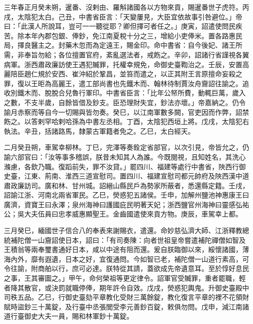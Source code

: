 
\begin{pinyinscope}

 三年春正月癸未朔，暹番、沒剌由、羅斛諸國各以方物來貢，賜暹番世子虎符。丙戌，太陰犯太白。己丑，中書省臣言：「天變屢見，大臣宜依故事引咎避位。」帝曰：「此漢人所說耳，豈可一一聽從耶？卿但擇可者任之。」庚寅，詔遣使問民疾苦。除本年內郡包銀、俸鈔，免江南夏稅十分之三，增給小吏俸米。置各路惠民局，擇良醫主之。封藥木忽而為定遠王，賜金印。命中書省：自今後妃、諸王所需，非奉旨勿給；各位擅置官府，紊亂選法者，戒飭之。辛卯，詔諸行省謹視各翼病軍。浙西肅政廉訪使王遇犯贓罪，托權幸規免，命御史臺鞫治之。壬辰，安置高麗陪臣趙仁規於安西、崔沖紹於鞏昌，並笞而遣之，以正其附王言原擅命妄殺之罪，復以王昛為高麗王，遣工部尚書也先鐵木而、翰林待制賈汝舟齎詔往諭之。追收別鐵木而、脫脫合兒魯行軍印。中書省臣言：「比年公帑所費，動輒巨萬，歲入之數，不支半歲，自餘皆借及鈔支。臣恐理財失宜，鈔法亦壞。」帝嘉納之。仍令諭月赤察而等自今一切賜與皆勿奏。癸巳，以江南軍數多闕，官吏因而作弊，詔禁飭之。以答剌罕哈剌哈孫為中書左丞相。丁酉，太陰犯西垣上將。戊戌，太陰犯右執法。辛丑，括諸路馬，隸蒙古軍籍者免之。乙巳，太白經天。



 二月癸丑朔，車駕幸柳林。丁巳，完澤等奏銓定省部官，以次引見，帝皆允之，仍諭六部官曰：「汝等事多稽誤，朕昔未知其人為誰。今既閱視，且知姓名，其洗心滌慮，各欽乃職。復蹈前失，罪不汝貸。」罷四川、福建等處行中書省，陜西行御史臺，江東、荊南、淮西三道宣慰司。置四川、福建宣慰司都元帥府及陜西漢中道肅政廉訪司。廣和林、甘州城。詔縉山縣民戶為勢家所蔽者，悉還縣定籍。壬戌，詔諭江浙、河南北兩省軍民。乙巳，熒惑犯五諸侯。壬申，加解州鹽池神惠康王曰廣濟，資寶王曰永澤；泉州海神曰護國庇民明著天妃；浙西鹽官州海神曰靈感弘祐公；吳大夫伍員曰忠孝威惠顯聖王。金齒國遣使來貢方物。庚辰，車駕幸上都。



 三月癸巳，緬國世子信合八的奉表來謝賜衣，遣還。命妙慈弘濟大師、江浙釋教總統補陀僧一山齎詔使日本，詔曰：「有司奏陳：向者世祖皇帝嘗遣補陀禪僧如智及王積翁等兩奉璽書通好日本，咸以中途有阻而還。爰自朕臨御以來，綏懷諸國，薄海內外，靡有遐遺，日本之好，宜復通問。今如智已老，補陀僧一山道行素高，可令往諭，附商舶以行，庶可必達。朕特從其請，蓋欲成先帝遺意耳。至於惇好息民之事，王其審圖之。」甲午，命何榮祖等更定律令。詔軍官受贓罪，重者罷職，輕者降其散官，或決罰就職停俸，期年許令自效。戊戌，熒惑犯輿鬼。升御史臺殿中司秩五品。乙巳，行御史臺劾平章教化受財三萬餘錠，教化復言平章的裡不花領財賦時盜鈔三十萬錠，及行臺中丞張閭受李元善鈔百錠，敕俱勿問。戊申，減江南諸道行臺御史大夫一員，賜和林軍鈔十萬錠。




\end{pinyinscope}
